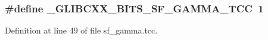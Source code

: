 \subsubsection[{\+\_\+\+G\+L\+I\+B\+C\+X\+X\+\_\+\+B\+I\+T\+S\+\_\+\+S\+F\+\_\+\+G\+A\+M\+M\+A\+\_\+\+T\+C\+C}]{\setlength{\rightskip}{0pt plus 5cm}\#define \+\_\+\+G\+L\+I\+B\+C\+X\+X\+\_\+\+B\+I\+T\+S\+\_\+\+S\+F\+\_\+\+G\+A\+M\+M\+A\+\_\+\+T\+C\+C~1}\label{sf__gamma_8tcc_accc383e52e4dc6eebfd313a52961b49b}


Definition at line 49 of file sf\+\_\+gamma.\+tcc.

